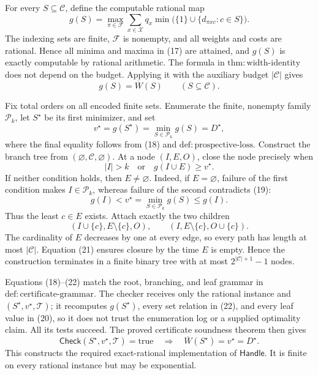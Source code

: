 For every \(S\subseteq\mathcal C\), define the computable rational map
\[
g(S)=\max_{\pi\in\mathcal F}\sum_{x\in\mathcal X}q_x
\min\bigl(\{1\}\cup\{d_{\pi xc}:c\in S\}\bigr).                     \tag{17}
\]
The indexing sets are finite, \(\mathcal F\) is nonempty, and all weights
and costs are rational.  Hence all minima and maxima in (17) are attained,
and \(g(S)\) is exactly computable by rational arithmetic.  The formula in
\(\mathrm{thm{:}width\text{-}identity}\) does not depend on the budget.
Applying it with the auxiliary budget \(|\mathcal C|\) gives
\[
g(S)=\overline W(S)\qquad(S\subseteq\mathcal C).                       \tag{18}
\]

Fix total orders on all encoded finite sets.  Enumerate the finite,
nonempty family \(\mathcal P_k\), let \(S^\star\) be its first minimizer,
and set
\[
v^\star=g(S^\star)=\min_{S\in\mathcal P_k}g(S)=D^\star,               \tag{19}
\]
where the final equality follows from (18) and
\(\mathrm{def{:}prospective\text{-}loss}\).  Construct the branch tree
from \((\varnothing,\mathcal C,\varnothing)\).  At a node \((I,E,O)\),
close the node precisely when
\[
|I|>k
\quad\text{or}\quad
g(I\cup E)\geq v^\star.                                                \tag{20}
\]
If neither condition holds, then \(E\neq\varnothing\).  Indeed, if
\(E=\varnothing\), failure of the first condition makes
\(I\in\mathcal P_k\), whereas failure of the second contradicts (19):
\[
g(I)<v^\star=\min_{S\in\mathcal P_k}g(S)\leq g(I).                    \tag{21}
\]
Thus the least \(c\in E\) exists.  Attach exactly the two children
\[
(I\cup\{c\},E\setminus\{c\},O),
\qquad
(I,E\setminus\{c\},O\cup\{c\}).                                     \tag{22}
\]
The cardinality of \(E\) decreases by one at every edge, so every path has
length at most \(|\mathcal C|\).  Equation (21) ensures closure by the time
\(E\) is empty.  Hence the construction terminates in a finite binary tree
with at most \(2^{|\mathcal C|+1}-1\) nodes.

Equations (18)--(22) match the root, branching, and leaf grammar in
\(\mathrm{def{:}certificate\text{-}grammar}\).  The checker receives only
the rational instance and \((S^\star,v^\star,\mathcal T)\); it recomputes
\(g(S^\star)\), every set relation in (22), and every leaf value in (20),
so it does not trust the enumeration log or a supplied optimality claim.
All its tests succeed.  The proved certificate soundness theorem then gives
\[
\mathsf{Check}(S^\star,v^\star,\mathcal T)=\mathrm{true}
\quad\Longrightarrow\quad
\overline W(S^\star)=v^\star=D^\star.                                 \tag{23}
\]
This constructs the required exact-rational implementation of
\(\mathsf{Handle}\).  It is finite on every rational instance but may be
exponential.

